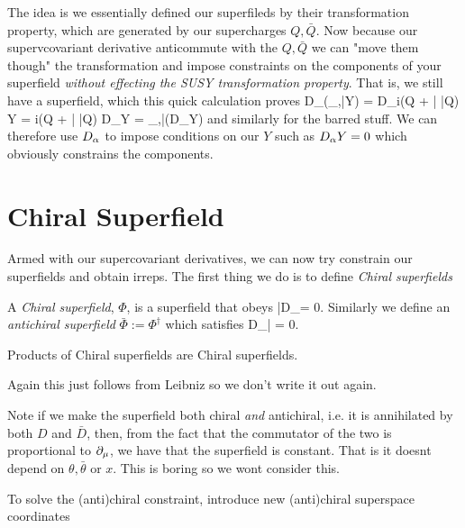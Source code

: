 The idea is we essentially defined our superfileds by their transformation property, which are generated by our supercharges $Q,\bar{Q}$. Now because our supervcovariant derivative anticommute with the $Q,\bar{Q}$ we can "move them though" the transformation and impose constraints on the components of your superfield \textit{without effecting the SUSY transformation property}. That is, we still have a superfield, which this quick calculation proves
\bse 
    D_{\a}(\del_{\epsilon,\bar{\epsilon}}Y) = D_{\a}i(\epsilon Q + \bar{\epsilon} \bar{Q}) Y = i(\epsilon Q + \bar{\epsilon} \bar{Q}) D_{\a}Y = \del_{\epsilon,\bar{\epsilon}}(D_{\a}Y)
\ese 
and similarly for the barred stuff. We can therefore use $D_{\alpha}$ to impose conditions on our $Y$ such as $D_{\alpha}Y =0$ which obviously constrains the components. 

\section{Chiral Superfield}

Armed with our supercovariant derivatives, we can now try constrain our superfields and obtain irreps. The first thing we do is to define \textit{Chiral superfields}

    A \textit{Chiral superfield}, $\Phi$, is a superfield that obeys 
    \be 
    \label{eqn:ChiralSuperfield}
        \bar{D}_{\dot{\a}}\Phi = 0.
    \ee 
    Similarly we define an \textit{antichiral superfield} $\bar{\Phi} := \Phi^{\dagger}$ which satisfies 
    \be
    \label{eqn:AntichiralSuperfield}
        D_{\a}\bar{\Phi} = 0.
    \ee 
\ed 


\bp 
    Products of Chiral superfields are Chiral superfields.
\ep 

\bq 
    Again this just follows from Leibniz so we don't write it out again.
\eq 

\br 
    Note if we make the superfield both chiral \textit{and} antichiral, i.e. it is annihilated by both $D$ and $\bar{D}$, then, from the fact that the commutator of the two is proportional to $\partial_{\mu}$, we have that the superfield is constant. That is it doesnt depend on $\theta,\bar{\theta}$ or $x$. This is boring so we wont consider this.
\er 

To solve the (anti)chiral constraint, introduce new (anti)chiral superspace coordinates

